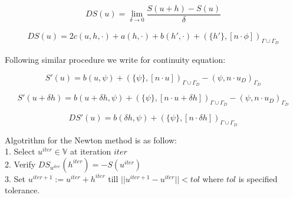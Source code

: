 \documentclass[a4paper]{book}
\begin{document}
\begin{flushleft}
\begin{equation}
DS(u) = \lim_{\delta \to 0} \frac{S(u+h)-S(u)}{\delta}
\end{equation}
\end{flushleft}

\begin{flushleft}
\begin{equation}
\begin{split}
DS(u) = 2 c(u,h,\cdot) + a(h,\cdot) + b(h',\cdot) + (\{h'\},[n\cdot \phi])_{\Gamma \cup \Gamma_D}
\end{split}
\end{equation}
\end{flushleft}

Following similar procedure we write for continuity equation:\\
\begin{flushleft}
\begin{equation}
S'(u) = b(u,\psi) + (\{\psi\},[n \cdot u])_{\Gamma \cup \Gamma_D} - (\psi,n \cdot u_D)_{\Gamma_D}
\end{equation}
\end{flushleft}

\begin{flushleft}
\begin{equation}
S'(u+\delta h) = b(u + \delta h,\psi) + (\{\psi\},[n \cdot u + \delta h])_{\Gamma \cup \Gamma_D} - (\psi,n \cdot u_D)_{\Gamma_D}
\end{equation}
\end{flushleft}

\begin{flushleft}
\begin{equation}
DS'(u) = b(\delta h,\psi) + (\{\psi\},[n \cdot \delta h])_{\Gamma \cup \Gamma_D} 
\end{equation}
\end{flushleft}


Algotrithm for the Newton method is as follow:\\

1. Select $u^{iter} \in \mathbb{V}$ at iteration $iter$\\

2. Verify $DS_{u^{iter}}(h^{iter}) = -S(u^{iter})$\\

3. Set $u^{iter + 1} := u^{iter} + h^{iter}$ till $||u^{iter+1} - u^{iter}|| < tol$ where $tol$ is specified tolerance.\\
\end{document}
